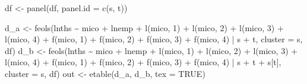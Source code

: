 \documentclass[
]{article}
\newenvironment{Shaded}{\begin{snugshade}}{\end{snugshade}}
\newcommand{\AttributeTok}[1]{\textcolor[rgb]{0.77,0.63,0.00}{#1}}
\newcommand{\ConstantTok}[1]{\textcolor[rgb]{0.00,0.00,0.00}{#1}}
\newcommand{\DecValTok}[1]{\textcolor[rgb]{0.00,0.00,0.81}{#1}}
\newcommand{\FunctionTok}[1]{\textcolor[rgb]{0.00,0.00,0.00}{#1}}
\newcommand{\NormalTok}[1]{#1}
\newcommand{\OtherTok}[1]{\textcolor[rgb]{0.56,0.35,0.01}{#1}}
\newcommand{\SpecialCharTok}[1]{\textcolor[rgb]{0.00,0.00,0.00}{#1}}
\newcommand{\StringTok}[1]{\textcolor[rgb]{0.31,0.60,0.02}{#1}}
\begin{document}
\begin{Shaded}
\begin{Highlighting}[]
\NormalTok{df }\OtherTok{\textless{}{-}} \FunctionTok{panel}\NormalTok{(df, }\AttributeTok{panel.id =} \FunctionTok{c}\NormalTok{(}\StringTok{\textquotesingle{}s\textquotesingle{}}\NormalTok{, }\StringTok{\textquotesingle{}t\textquotesingle{}}\NormalTok{))}
  
\NormalTok{d\_a }\OtherTok{\textless{}{-}} \FunctionTok{feols}\NormalTok{(lnths }\SpecialCharTok{\textasciitilde{}}\NormalTok{ mico }\SpecialCharTok{+}\NormalTok{ lnemp }\SpecialCharTok{+} 
               \FunctionTok{l}\NormalTok{(mico, }\DecValTok{1}\NormalTok{) }\SpecialCharTok{+} \FunctionTok{l}\NormalTok{(mico, }\DecValTok{2}\NormalTok{) }\SpecialCharTok{+} \FunctionTok{l}\NormalTok{(mico, }\DecValTok{3}\NormalTok{) }\SpecialCharTok{+} \FunctionTok{l}\NormalTok{(mico, }\DecValTok{4}\NormalTok{) }\SpecialCharTok{+}
               \FunctionTok{f}\NormalTok{(mico, }\DecValTok{1}\NormalTok{) }\SpecialCharTok{+} \FunctionTok{f}\NormalTok{(mico, }\DecValTok{2}\NormalTok{) }\SpecialCharTok{+} \FunctionTok{f}\NormalTok{(mico, }\DecValTok{3}\NormalTok{) }\SpecialCharTok{+} \FunctionTok{f}\NormalTok{(mico, }\DecValTok{4}\NormalTok{) }
               \SpecialCharTok{|}\NormalTok{ s }\SpecialCharTok{+}\NormalTok{ t, }\AttributeTok{cluster =} \StringTok{\textquotesingle{}s\textquotesingle{}}\NormalTok{, df)}
\NormalTok{d\_b }\OtherTok{\textless{}{-}} \FunctionTok{feols}\NormalTok{(lnths }\SpecialCharTok{\textasciitilde{}}\NormalTok{ mico }\SpecialCharTok{+}\NormalTok{ lnemp }\SpecialCharTok{+} 
               \FunctionTok{l}\NormalTok{(mico, }\DecValTok{1}\NormalTok{) }\SpecialCharTok{+} \FunctionTok{l}\NormalTok{(mico, }\DecValTok{2}\NormalTok{) }\SpecialCharTok{+} \FunctionTok{l}\NormalTok{(mico, }\DecValTok{3}\NormalTok{) }\SpecialCharTok{+} \FunctionTok{l}\NormalTok{(mico, }\DecValTok{4}\NormalTok{) }\SpecialCharTok{+}
               \FunctionTok{f}\NormalTok{(mico, }\DecValTok{1}\NormalTok{) }\SpecialCharTok{+} \FunctionTok{f}\NormalTok{(mico, }\DecValTok{2}\NormalTok{) }\SpecialCharTok{+} \FunctionTok{f}\NormalTok{(mico, }\DecValTok{3}\NormalTok{) }\SpecialCharTok{+} \FunctionTok{f}\NormalTok{(mico, }\DecValTok{4}\NormalTok{) }
               \SpecialCharTok{|}\NormalTok{ s }\SpecialCharTok{+}\NormalTok{ t }\SpecialCharTok{+}\NormalTok{ s[t], }\AttributeTok{cluster =} \StringTok{\textquotesingle{}s\textquotesingle{}}\NormalTok{, df)}
\NormalTok{out }\OtherTok{\textless{}{-}} \FunctionTok{etable}\NormalTok{(d\_a, d\_b, }\AttributeTok{tex =} \ConstantTok{TRUE}\NormalTok{) }
\end{Highlighting}
\end{Shaded}
\end{document}
